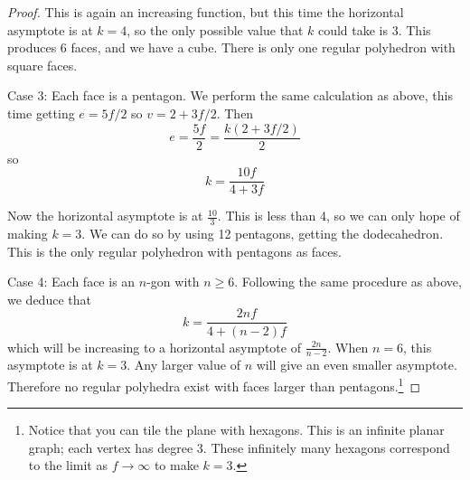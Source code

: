 \documentclass[10pt,]{book}
\theoremstyle{plain}
\theoremstyle{definition}
\theoremstyle{definition}
\theoremstyle{definition}
\numberwithin{equation}{chapter}
\begin{document}
\begin{proof}
This is again an increasing function, but this time the horizontal asymptote is at \(k = 4\), so the only possible value that \(k\) could take is 3. This produces 6 faces, and we have a cube. There is only one regular polyhedron with square faces.
%
\par

Case 3: Each face is a pentagon. We perform the same calculation as above, this time getting \(e = 5f/2\) so \(v = 2 + 3f/2\). Then
\begin{equation*}
  e = \frac{5f}{2} = \frac{k(2+3f/2)}{2}
\end{equation*}
so
\begin{equation*}
  k = \frac{10f}{4+3f}
\end{equation*}
%
\par

Now the horizontal asymptote is at \(\frac{10}{3}\). This is less than 4, so we can only hope of making \(k = 3\). We can do so by using 12 pentagons, getting the dodecahedron. This is the only regular polyhedron with pentagons as faces.
%
\par

Case 4: Each face is an \(n\)-gon with \(n \ge 6\). Following the same procedure as above, we deduce that
\begin{equation*}
  k = \frac{2nf}{4+(n-2)f}
\end{equation*}
which will be increasing to a horizontal asymptote of \(\frac{2n}{n-2}\). When \(n = 6\), this asymptote is at \(k = 3\). Any larger value of \(n\) will give an even smaller asymptote. Therefore no regular polyhedra exist with faces larger than pentagons.\footnote{Notice that you can tile the plane with hexagons.  This is an infinite planar graph; each vertex has degree 3.  These infinitely many hexagons correspond to the limit as \(f \to \infty\) to make \(k = 3\).\label{fn-14}}
%
\end{proof}
\typeout{************************************************}
\typeout{************************************************}
\end{document}
